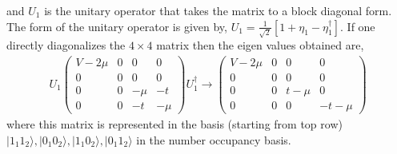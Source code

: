 \documentclass[12pt,a4paper]{article}
\begin{document}
and $U_{1}$ is the unitary operator that takes the matrix to a block diagonal form.
The form of the unitary operator is given by, $U_{1} =\frac{1}{\sqrt{2}}[1+\eta_{1}-\eta^{\dagger}_{1}]$. If one directly diagonalizes the $4\times 4$ matrix then the eigen values obtained are,
\begin{eqnarray}
U_{1}\begin{pmatrix}
 V-2\mu & 0 & 0 &0\\
 0 & 0 &0 &0 \\
 0 & 0 & -\mu & -t\\
 0 & 0 & -t & -\mu 
\end{pmatrix}U_{1}^{\dagger}\rightarrow  \begin{pmatrix}
 V-2\mu & 0 & 0 &0\\
 0 & 0 &0 &0 \\
 0 & 0 & t-\mu & 0\\
 0 & 0 & 0 & -t-\mu 
\end{pmatrix}
\end{eqnarray}
where this matrix is represented in the basis (starting from top row) $|1_{1}1_{2}\rangle, |0_{1}0_{2}\rangle , |1_{1}0_{2}\rangle, |0_{1}1_{2}\rangle$ in the number occupancy basis.
\end{document}
